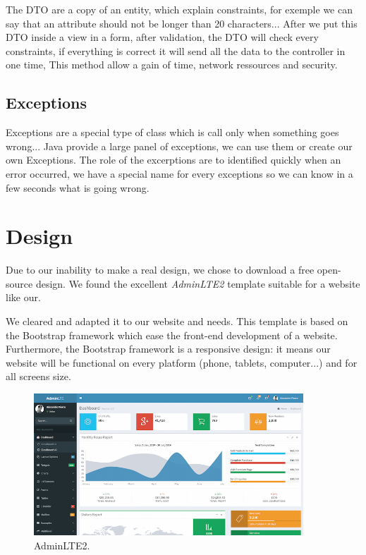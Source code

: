 The DTO are a copy of an entity, which explain constraints, for exemple we can say that an attribute should not be longer than 20 characters...
After we put this DTO inside a view in a form, after validation, the DTO will check every constraints, if everything is correct it will send all the data to the controller in one time,
This method allow a gain of time, network ressources and security.

\subsection{Exceptions}

Exceptions are a special type of class which is call only when something goes wrong...
Java provide a large panel of exceptions, we can use them or create our own Exceptions.
The role of the excerptions are to identified quickly when an error occurred, we have a special name for every exceptions so we can know in a few seconds what is going wrong.


\section{Design}
Due to our inability to make a real design, we chose to download a free open-source design. We found the excellent \textit{AdminLTE2} template suitable for a website like our.
\newline

We cleared and adapted it to our website and needs.
This template is based on the Bootstrap framework which ease the front-end development of a website. Furthermore, the Bootstrap framework is a responsive design: it means our website will be functional on every platform (phone, tablets, computer...) and for all screens size.

\begin{figure}[!ht]
  \caption{AdminLTE2.}
  \centering
    \includegraphics[width=0.9\textwidth]{img/design.png}
\end{figure}








